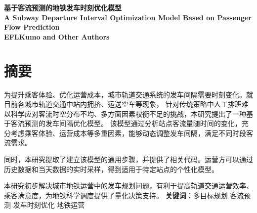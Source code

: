 \thispagestyle{empty}   %

\begin{center}
    \textbf{\fontsize{20}{1.5}基于客流预测的地铁发车时刻优化模型}
    \\
    \textbf{\fontsize{12}{1.5}A Subway Departure Interval Optimization Model Based on Passenger Flow Prediction}
    \\
    \textbf{\fontsize{12}{1.5}EFLKumo and Other Authors}

\end{center}





%
%


\section*{摘要}

为提升乘客体验、优化运营成本，城市轨道交通系统的发车间隔需要时刻变化。就目前各城市轨道交通中站内拥挤、运送空车等现象，
针对传统策略中人工排班难以科学应对客流时空分布不均、多方面因素权衡不足的挑战，本研究提出了一种基于客流预测的发车间隔优化模型。
该模型通过分析站点客流量随时间的变化，充分考虑乘客体验、运营成本等多重因素，能够动态调整发车间隔，满足不同时段客流需求。

同时，本研究提取了建立该模型的通用步骤，并提供了相关代码。运营方可以通过历史数据和当天数据的实时采样，得到适用于特定站点的个性化模型。

本研究初步解决城市地铁运营中的发车规划问题，有利于提高轨道交通运营效率、乘客满意度，为地铁科学调度提供了量化决策支持。\newline
\newline
\textbf{关键词}：多目标规划 \quad 客流预测 \quad 发车时刻优化 \quad 地铁运营